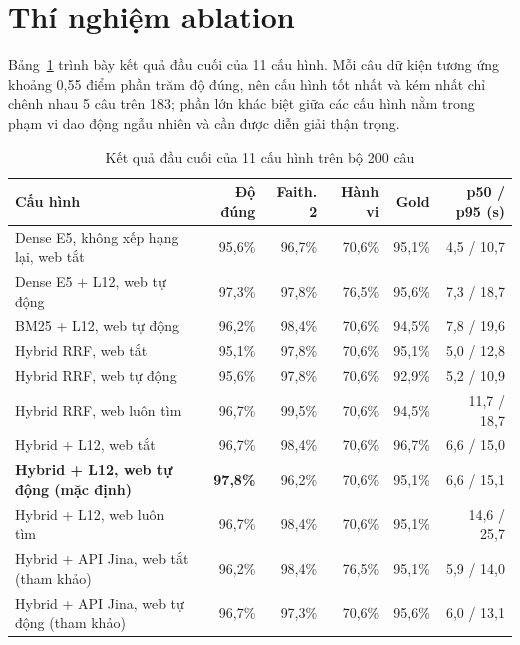 \section{Thí nghiệm ablation}
\label{sec:ablation}

Bảng~\ref{tab:ablation} trình bày kết quả đầu cuối của 11 cấu hình. Mỗi câu dữ kiện tương ứng khoảng 0,55 điểm phần trăm độ đúng, nên cấu hình tốt nhất và kém nhất chỉ chênh nhau 5 câu trên 183; phần lớn khác biệt giữa các cấu hình nằm trong phạm vi dao động ngẫu nhiên và cần được diễn giải thận trọng.

\begin{table}[H]
    \centering
    \caption{Kết quả đầu cuối của 11 cấu hình trên bộ 200 câu}
    \label{tab:ablation}
    \small
    \begin{tabularx}{\textwidth}{|>{\raggedright\arraybackslash}X|r|r|r|r|r|}
        \toprule
        \textbf{Cấu hình} & \textbf{Độ đúng} & \textbf{Faith. 2} & \textbf{Hành vi} & \textbf{Gold} & \textbf{p50 / p95 (s)} \\
        \midrule
        Dense E5, không xếp hạng lại, web tắt & 95,6\% & 96,7\% & 70,6\% & 95,1\% & 4,5 / 10,7 \\ \hline
        Dense E5 + L12, web tự động & 97,3\% & 97,8\% & 76,5\% & 95,6\% & 7,3 / 18,7 \\ \hline
        BM25 + L12, web tự động & 96,2\% & 98,4\% & 70,6\% & 94,5\% & 7,8 / 19,6 \\ \hline
        Hybrid RRF, web tắt & 95,1\% & 97,8\% & 70,6\% & 95,1\% & 5,0 / 12,8 \\ \hline
        Hybrid RRF, web tự động & 95,6\% & 97,8\% & 70,6\% & 92,9\% & 5,2 / 10,9 \\ \hline
        Hybrid RRF, web luôn tìm & 96,7\% & 99,5\% & 70,6\% & 94,5\% & 11,7 / 18,7 \\ \hline
        Hybrid + L12, web tắt & 96,7\% & 98,4\% & 70,6\% & 96,7\% & 6,6 / 15,0 \\ \hline
        \textbf{Hybrid + L12, web tự động (mặc định)} & \textbf{97,8\%} & 96,2\% & 70,6\% & 95,1\% & 6,6 / 15,1 \\ \hline
        Hybrid + L12, web luôn tìm & 96,7\% & 98,4\% & 70,6\% & 95,1\% & 14,6 / 25,7 \\ \hline
        Hybrid + API Jina, web tắt (tham khảo) & 96,2\% & 98,4\% & 76,5\% & 95,1\% & 5,9 / 14,0 \\ \hline
        Hybrid + API Jina, web tự động (tham khảo) & 96,7\% & 97,3\% & 70,6\% & 95,6\% & 6,0 / 13,1 \\
        \bottomrule
    \end{tabularx}
\end{table}

